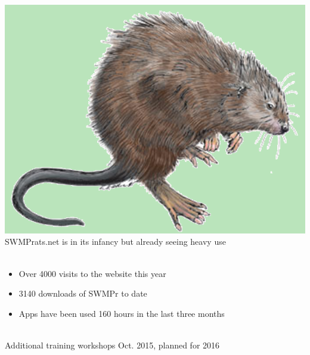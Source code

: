 \documentclass[serif]{beamer}\usepackage[]{graphicx}\usepackage[]{color}
\begin{document}
\begin{frame}[fragile]{\includegraphics[width=0.05\paperwidth]{fig/muskrat.png}\hspace{0.07in}{\bf Continuing work and engagement}}
SWMPrats.net is in its infancy but already seeing heavy use \\~\\
\begin{itemize}
\item Over 4000 visits to the website this year
\item 3140 downloads of SWMPr to date
\item Apps have been used 160 hours in the last three months \\~\\
\end{itemize}
Additional training workshops Oct. 2015, planned for 2016 \\~\\
\begin{columns}
\begin{column}{0.45\textwidth}
\centerline{}

\end{column}
\end{columns}
\end{frame}
\end{document}
